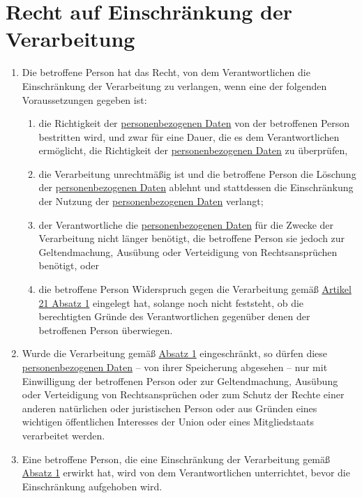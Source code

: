 \chapter{Recht auf Einschränkung der Verarbeitung}
\label{ch:18}


\begin{enumerate}

  \item Die betroffene Person hat das Recht, von dem Verantwortlichen die Einschränkung der Verarbeitung zu verlangen,
   wenn eine der folgenden Voraussetzungen gegeben ist:
  \label{itm:18-1}

  \begin{enumerate}
  
    \item die Richtigkeit der \hyperref[itm:04-1]{personenbezogenen Daten} von der betroffenen Person bestritten wird, und zwar für eine
     Dauer, die es dem Verantwortlichen ermöglicht, die Richtigkeit der \hyperref[itm:04-1]{personenbezogenen Daten} zu überprüfen,
    \label{itm:18-1a}

    \item die Verarbeitung unrechtmäßig ist und die betroffene Person die Löschung der \hyperref[itm:04-1]{personenbezogenen Daten} ablehnt
     und stattdessen die Einschränkung der Nutzung der \hyperref[itm:04-1]{personenbezogenen Daten} verlangt;
    \label{itm:18-1b}

    \item der Verantwortliche die \hyperref[itm:04-1]{personenbezogenen Daten} für die Zwecke der Verarbeitung nicht länger benötigt, die
     betroffene Person sie jedoch zur Geltendmachung, Ausübung oder Verteidigung von Rechtsansprüchen benötigt, oder
    \label{itm:18-1c}

    \item die betroffene Person Widerspruch gegen die Verarbeitung gemäß \hyperref[itm:21-1]{Artikel 21 Absatz 1}
     eingelegt hat, solange noch nicht feststeht, ob die berechtigten Gründe des Verantwortlichen gegenüber denen der
     betroffenen Person überwiegen.
    \label{itm:18-1d}

  \end{enumerate}

  \item Wurde die Verarbeitung gemäß \hyperref[itm:18-1]{Absatz 1} eingeschränkt, so dürfen diese \hyperref[itm:04-1]{personenbezogenen Daten}
   -- von ihrer Speicherung abgesehen -- nur mit Einwilligung der betroffenen Person oder zur Geltendmachung, Ausübung
   oder Verteidigung von Rechtsansprüchen oder zum Schutz der Rechte einer anderen natürlichen oder juristischen
   Person oder aus Gründen eines wichtigen öffentlichen Interesses der Union oder eines Mitgliedstaats verarbeitet
   werden.
  \label{itm:18-2}

  \item Eine betroffene Person, die eine Einschränkung der Verarbeitung gemäß \hyperref[itm:18-1]{Absatz 1} erwirkt hat,
   wird von dem Verantwortlichen unterrichtet, bevor die Einschränkung aufgehoben wird.
  \label{itm:18-3}

\end{enumerate}



